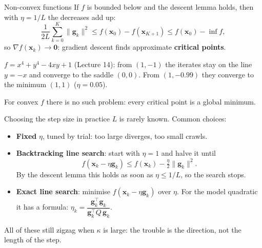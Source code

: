\documentclass[10pt]{wosm-slides}
\newcommand{\norm}[1]{\lVert #1 \rVert}
\newcommand{\vx}{\mathbf{x}}
\newcommand{\vg}{\mathbf{g}}
\begin{document}
\begin{frame}{Non-convex functions}
  If $f$ is bounded below and the descent lemma holds, then with $\eta = 1/L$ the decreases add up:
  \[ \frac{1}{2L}\sum_{k=0}^{K} \norm{\vg_k}^2 \le f(\vx_0) - f(\vx_{K+1}) \le f(\vx_0) - \inf f , \]
  so $\nabla f(\vx_k) \to \mathbf 0$: gradient descent finds approximate \textbf{critical points}.
  \pause
  \begin{warning}
    $f = x^4 + y^4 - 4xy + 1$ (Lecture 14): from $(1, -1)$ the iterates stay on the line $y = -x$
    and converge to the saddle $(0, 0)$. From $(1, -0.99)$ they converge to the minimum $(1, 1)$
    ($\eta = 0.05$).
  \end{warning}
  \pause
  {\small For convex $f$ there is no such problem: every critical point is a global minimum.\par}
\end{frame}

\begin{frame}{Choosing the step size in practice}
  $L$ is rarely known. Common choices:
  \begin{itemize}
    \item \textbf{Fixed} $\eta$, tuned by trial: too large diverges, too small crawls.
    \pause
    \item \textbf{Backtracking line search}: start with $\eta = 1$ and halve it until
      \[ f(\vx_k - \eta\vg_k) \le f(\vx_k) - \tfrac{\eta}{2}\norm{\vg_k}^2 . \]
      By the descent lemma this holds as soon as $\eta \le 1/L$, so the search stops.
    \pause
    \item \textbf{Exact line search}: minimise $f(\vx_k - \eta\vg_k)$ over $\eta$. For the model
      quadratic it has a formula: $\eta_k = \dfrac{\vg_k^\top\vg_k}{\vg_k^\top Q\,\vg_k}$.
  \end{itemize}
  \pause
  {\small All of these still zigzag when $\kappa$ is large: the trouble is the direction, not the
  length of the step.\par}
\end{frame}
\end{document}
